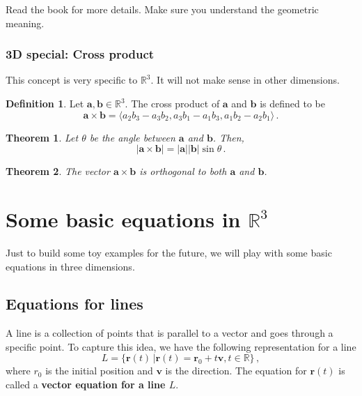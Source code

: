 \documentclass[
]{article}
\newtheorem{theorem}{Theorem}[section]
\theoremstyle{definition}
\newtheorem{definition}{Definition}[section]
\theoremstyle{definition}
\theoremstyle{definition}
\theoremstyle{definition}
\theoremstyle{remark}
\begin{document}
Read the book for more details.
Make sure you understand the geometric meaning.

\subsubsection{3D special: Cross product}\label{d-special-cross-product}

This concept is very specific to \(\mathbb{R}^3\).
It will not make sense in other dimensions.

\begin{definition}
Let \(\mathbf{a}, \mathbf{b} \in \mathbb{R}^3\).
The cross product of \(\mathbf{a}\) and \(\mathbf{b}\) is defined to be
\begin{equation*}
    \mathbf{a} \times \mathbf{b} = \langle a_2 b_3 - a_3 b_2, a_3b_1 - a_1 b_3, a_1b_2 - a_2b_1 \rangle \,.
\end{equation*}
\end{definition}

\begin{theorem}
Let \(\theta\) be the angle between \(\mathbf{a}\) and \(\mathbf{b}\). Then,
\begin{equation*}
    | \mathbf{a} \times \mathbf{b} | = |\mathbf{a}||\mathbf{b}| \sin\theta \,.
\end{equation*}
\end{theorem}

\begin{theorem}
The vector \(\mathbf{a}\times \mathbf{b}\) is orthogonal to both \(\mathbf{a}\) and \(\mathbf{b}\).
\end{theorem}

\newpage

\section{\texorpdfstring{Some basic equations in \(\mathbb{R}^3\)}{Some basic equations in \textbackslash mathbb\{R\}\^{}3}}\label{some-basic-equations-in-mathbbr3}

Just to build some toy examples for the future, we will play with some basic
equations in three dimensions.

\subsection{Equations for lines}\label{equations-for-lines}

A line is a collection of points that is parallel to a vector and goes through a
specific point.
To capture this idea, we have the following representation for a line
\begin{equation*}
    L = \{\mathbf{r}(t) \,|  \mathbf{r}(t) = \mathbf{r}_0 + t \mathbf{v}, t\in \mathbb{R}\}  \,,
\end{equation*}
where \({r}_0\) is the initial position and \(\mathbf{v}\) is the direction.
The equation for \(\mathbf{r}(t)\) is called a \textbf{vector equation for a line \(L\)}.
\end{document}
